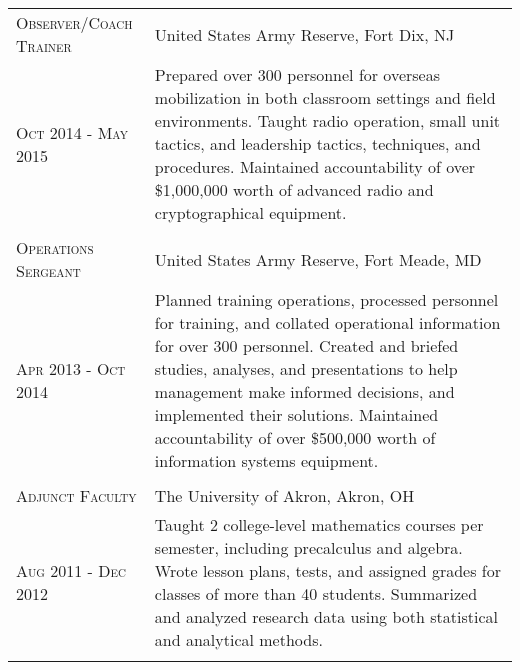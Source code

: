 \documentclass[letterpaper,10pt]{article} %
\begin{document}
\begin{center}
\begin{tabular}{R{4.25cm}L{11.25cm}}

\textsc{Observer/Coach Trainer} & United States Army Reserve, Fort Dix, NJ\\ 
\textsc{Oct 2014 - May 2015} & Prepared over 300 personnel for overseas mobilization in both classroom settings and field environments.  Taught radio operation, small unit tactics, and leadership tactics, techniques, and procedures.  Maintained accountability of over \$1,000,000 worth of advanced radio and cryptographical equipment.\\
 \\


\textsc{Operations Sergeant} & United States Army Reserve, Fort Meade, MD\\
\textsc{Apr 2013 - Oct 2014} & Planned training operations, processed personnel for training, and collated operational information for over 300 personnel.  Created and briefed studies, analyses, and presentations to help management make informed decisions, and implemented their solutions.  Maintained accountability of over \$500,000 worth of information systems equipment.\\
 \\


\textsc{Adjunct Faculty} & The University of Akron, Akron, OH\\
\textsc{Aug 2011 - Dec 2012} & Taught 2 college-level mathematics courses per semester, including precalculus and algebra.  Wrote lesson plans, tests, and assigned grades for classes of more than 40 students.  Summarized and analyzed research data using both statistical and analytical methods.\\
 \\

\end{tabular}
\end{center}
\end{document}
